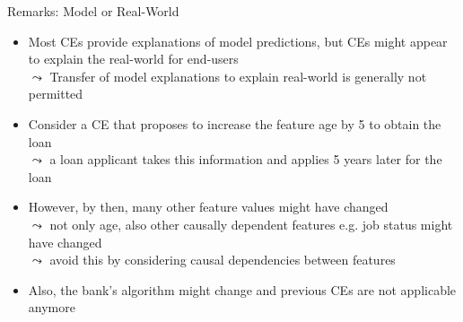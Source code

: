 \documentclass[11pt,compress,t,notes=noshow, aspectratio=169, xcolor=table, usenames,dvipsnames]{beamer}
\begin{document}
\begin{frame}[c]{Remarks: Model or Real-World}

	\begin{itemize}[<+->]
	\item Most CEs provide explanations of model predictions, but CEs might appear to explain the real-world for end-users\\
$\leadsto$ Transfer of model explanations to explain real-world is generally not permitted
	\item Consider a CE that proposes to increase the feature age by 5 to obtain the loan\\
	$\leadsto$ a loan applicant takes this information and applies 5 years later for the loan
	\item However, by then, many 
	other feature values 
	might have changed\\
	$\leadsto$ not only age, also other causally dependent features e.g. job status might have changed \\%
	$\leadsto$  avoid this by considering causal dependencies between features
	\item Also, the bank's algorithm might change and previous CEs are not applicable anymore
	\end{itemize}
\end{frame}


\endlecture
\end{document}

